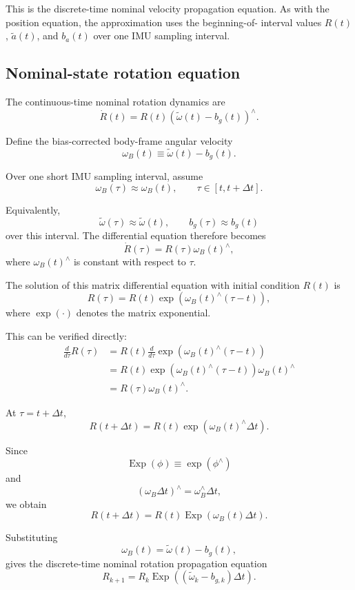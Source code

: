 \documentclass[11pt]{article}
\numberwithin{equation}{section}
\newcommand{\Exp}{\operatorname{Exp}}
\begin{document}
This is the discrete-time nominal velocity propagation equation.  As
with the position equation, the approximation uses the beginning-of-
interval values $R(t)$, $\tilde a(t)$, and $b_a(t)$ over one IMU
sampling interval.


\subsection{Nominal-state rotation equation}

The continuous-time nominal rotation dynamics are
\begin{equation}
\boxed{
\dot R(t)
=
R(t)(\tilde\omega(t)-b_g(t))^\wedge.
}
\end{equation}

Define the bias-corrected body-frame angular velocity
\[
\omega_B(t)
\equiv
\tilde\omega(t)-b_g(t).
\]

Over one short IMU sampling interval, assume
\begin{equation}
\boxed{
\omega_B(\tau)\approx\omega_B(t),
\qquad
\tau\in[t,t+\Delta t].
}
\end{equation}

Equivalently,
\[
\tilde\omega(\tau)\approx\tilde\omega(t),
\qquad
b_g(\tau)\approx b_g(t)
\]
over this interval.  The differential equation therefore becomes
\[
\dot R(\tau)
=
R(\tau)\omega_B(t)^\wedge,
\]
where $\omega_B(t)^\wedge$ is constant with respect to $\tau$.

The solution of this matrix differential equation with initial
condition $R(t)$ is
\[
R(\tau)
=
R(t)
\exp\!\left(
\omega_B(t)^\wedge(\tau-t)
\right),
\]
where $\exp(\cdot)$ denotes the matrix exponential.

This can be verified directly:
\begin{align}
\frac{d}{d\tau}R(\tau)
&=
R(t)
\frac{d}{d\tau}
\exp\!\left(
\omega_B(t)^\wedge(\tau-t)
\right)
\\
&=
R(t)
\exp\!\left(
\omega_B(t)^\wedge(\tau-t)
\right)
\omega_B(t)^\wedge
\\
&=
R(\tau)\omega_B(t)^\wedge.
\end{align}

At $\tau=t+\Delta t$,
\[
R(t+\Delta t)
=
R(t)
\exp\!\left(
\omega_B(t)^\wedge\Delta t
\right).
\]

Since
\[
\Exp(\phi)
\equiv
\exp(\phi^\wedge)
\]
and
\[
(\omega_B\Delta t)^\wedge
=
\omega_B^\wedge\Delta t,
\]
we obtain
\[
R(t+\Delta t)
=
R(t)
\Exp\!\left(
\omega_B(t)\Delta t
\right).
\]

Substituting
\[
\omega_B(t)
=
\tilde\omega(t)-b_g(t),
\]
gives the discrete-time nominal rotation propagation equation
\begin{equation}
\boxed{
R_{k+1}
=
R_k
\Exp\!\left(
(\tilde\omega_k-b_{g,k})\Delta t
\right).
}
\end{equation}
\end{document}

